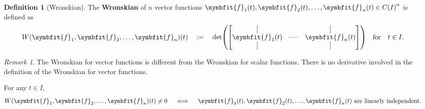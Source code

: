 \documentclass[10pt,UTF8]{article}
\renewcommand{\vec}[1]{%
  \ifnum0\ifcat#1a1\else0\fi>0
  \symbfit{#1}  %
  \else
  \symbf{#1}  %
  \fi
}
\newenvironment{definitionBox}
{ \bigskip
  \begin{tcolorbox}[colback=blue!5!white,colframe=blue!75!black,parbox=false,before
  upper=\par,before lower=\par]}
  {
\end{tcolorbox}}
\newenvironment{theoremBox}
{ \bigskip
  \begin{tcolorbox}[colback=yellow!5!white,colframe=yellow!75!black,parbox=false,before
  upper=\par,before lower=\par]}
  {
\end{tcolorbox}}
\theoremstyle{definition}
\newtheorem{definition inner}{Definition}[section]
\newenvironment{definition}[1][]
{
  \begin{definitionBox}
  \begin{definition inner}[#1]\hfill\par}
    {
    \end{definition inner}
\end{definitionBox}}
\theoremstyle{definition}
\newtheorem{theorem inner}{Theorem}[section]
\theoremstyle{definition}
\newtheorem*{proof inner}{\textit{Proof}}
\theoremstyle{plain}
\newtheorem{tip inner}{Tip}[section]
\theoremstyle{remark}
\newtheorem*{remark}{\textit{Remark}}
\begin{document}
\begin{definition}[Wronskian]
  The \textbf{Wronskian} of \(n\) vector functions
  \(\vec{f}_1(t), \vec{f}_2(t), \ldots, \vec{f}_n(t) \in {C(I)}^n \)
  is defined as
  \begin{equation*}
    W(\vec{f}_1, \vec{f}_2, \ldots, \vec{f}_n)(t)
    \quad
    :=
    \quad
    \det(
      \begin{bmatrix}
        \vrule & & \vrule \\
        \vec{f}_1(t) & \cdots & \vec{f}_n(t) \\
        \vrule & & \vrule
    \end{bmatrix})
    \qfor t\in I.
  \end{equation*}
\end{definition}

\begin{remark}
  The Wronskian for vector functions is different from
  the Wronskian for scalar functions.
  There is no derivative involved in the definition of
  the Wronskian for vector functions.
\end{remark}

\begin{theoremBox}
  \noindent For any \( t \in I \),
  \begin{equation*}
    W(\vec{f}_1, \vec{f}_2, \ldots, \vec{f}_n)(t) \ne 0
    \quad\iff\quad
    \vec{f}_1(t), \vec{f}_2(t), \ldots, \vec{f}_n(t)
    \text{ are linearly independent}.
  \end{equation*}
\end{theoremBox}
\end{document}
